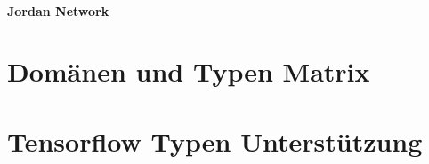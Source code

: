\paragraph{Jordan Network}

\section{Domänen und Typen Matrix}

\section{Tensorflow Typen Unterstützung}
